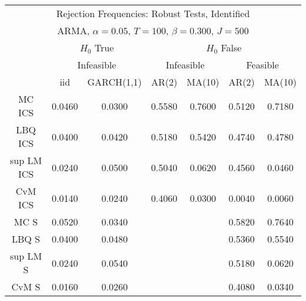  \begin{table}[H] 
 \tiny 
 \centering 
\begin{tabular}{|c|c|c||c|c|c|c|} 
\multicolumn{7}{c}{ Rejection Frequencies: Robust Tests, Identified } \\ 
\multicolumn{7}{c}{ ARMA, $\alpha = 0.05$, $T=100$, $\beta = 0.300$, $J=500$ } \\ 
  \multicolumn{1}{c}{ } & \multicolumn{2}{c}{ $H_{0}$ True} & \multicolumn{4}{c}{ $H_{0}$ False} \\ 
  \multicolumn{1}{c}{ } & \multicolumn{2}{c}{ Infeasible } & \multicolumn{2}{c}{ Infeasible } & \multicolumn{2}{c}{ Feasible} \\ 
 \hline 
 & iid & GARCH(1,1) & AR(2) & MA(10) & AR(2) & MA(10)  \\ 
 \hline 
 MC ICS &  0.0460 &  0.0300 &  0.5580 &  0.7600 &  0.5120 &  0.7180 \\ 
 LBQ ICS &  0.0400 &  0.0420 &  0.5180 &  0.5420 &  0.4740 &  0.4780 \\ 
 sup LM ICS &  0.0240 &  0.0500 &  0.5040 &  0.0620 & 0.4560 &  0.0460 \\ 
 CvM ICS &  0.0140 &  0.0240 &  0.4060 &  0.0300 &  0.0040 &  0.0060 \\ 
 \hline 
 MC S &  0.0520 &  0.0340 & & & 0.5820 &  0.7640  \\ %
 LBQ S &  0.0400 &  0.0480 & & & 0.5360 &  0.5540  \\ %
 sup LM S &  0.0240 &  0.0540 & & & 0.5180 &  0.0620  \\ %
 CvM S &  0.0160 &  0.0260 & & & 0.4080 &  0.0340 \\ %

\end{tabular}
\end{table}

